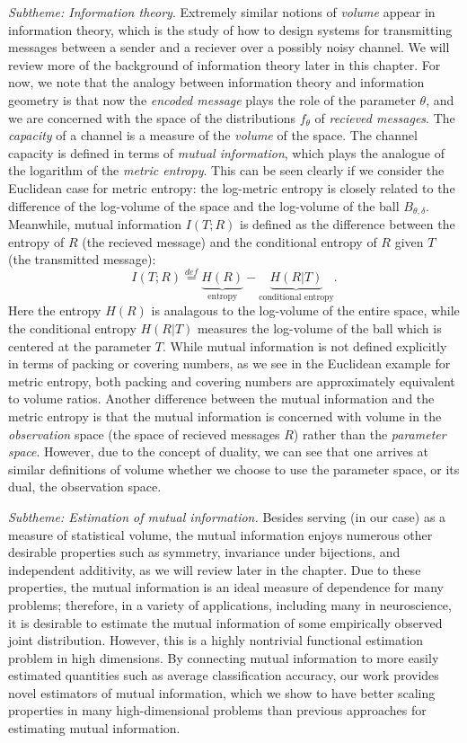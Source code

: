 \emph{Subtheme: Information theory}.  Extremely similar notions of
\emph{volume} appear in information theory, which is the study of how
to design systems for transmitting messages between a sender and a
reciever over a possibly noisy channel.  We will review more of the
background of information theory later in this chapter.  For now, we
note that the analogy between information theory and information
geometry is that now the \emph{encoded message} plays the role of the
parameter $\theta$, and we are concerned with the space of the
distributions $f_\theta$ of \emph{recieved messages}.  The
\emph{capacity} of a channel is a measure of the \emph{volume} of the
space.  The channel capacity is defined in terms of \emph{mutual
  information}, which plays the analogue of the logarithm of the
\emph{metric entropy}.  This can be seen clearly if we consider the
Euclidean case for metric entropy: the log-metric entropy is closely
related to the difference of the log-volume of the space and the
log-volume of the ball $B_{\theta, \delta}$.  Meanwhile, mutual
information $I(T; R)$ is defined as the difference between the entropy of $R$ (the recieved message)
and the conditional entropy of $R$ given $T$ (the transmitted message):
\[
I(T; R) \stackrel{def}{=} \underbrace{H(R)}_{\text{entropy}} - \underbrace{H(R|T)}_{\text{conditional entropy}}.
\]
Here the entropy $H(R)$ is analagous to the log-volume of the entire
space, while the conditional entropy $H(R|T)$ measures the log-volume
of the ball which is centered at the parameter $T$.  While mutual
information is not defined explicitly in terms of packing or covering
numbers, as we see in the Euclidean example for metric entropy, both
packing and covering numbers are approximately equivalent to volume
ratios.  Another difference between the mutual information and the
metric entropy is that the mutual information is concerned with volume
in the \emph{observation} space (the space of recieved messages $R$)
rather than the \emph{parameter space}.  However, due to the concept
of duality, we can see that one arrives at similar definitions of
volume whether we choose to use the parameter space, or its dual, the
observation space.

\emph{Subtheme: Estimation of mutual information.}  Besides serving
(in our case) as a measure of statistical volume, the mutual
information enjoys numerous other desirable properties such as
symmetry, invariance under bijections, and independent additivity, as
we will review later in the chapter.  Due to these properties, the
mutual information is an ideal measure of dependence for many
problems; therefore, in a variety of applications, including many in
neuroscience, it is desirable to estimate the mutual information of
some empirically observed joint distribution.  However, this is a
highly nontrivial functional estimation problem in high dimensions.
By connecting mutual information to more easily estimated quantities
such as average classification accuracy, our work provides novel
estimators of mutual information, which we show to have better scaling
properties in many high-dimensional problems than previous approaches
for estimating mutual information.

